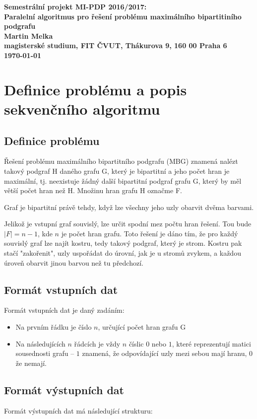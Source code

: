 \documentclass[czech]{article}
\begin{document}
\begin{center}
\bf Semestrální projekt MI-PDP 2016/2017:\\[5mm]
    Paralelní algoritmus pro řešení problému maximálního bipartitiního podgrafu\\[5mm] 
       Martin Melka\\[2mm]
magisterské studium, FIT ČVUT, Thákurova 9, 160 00 Praha 6\\[2mm]
\today
\end{center}

\section{Definice problému a popis sekvenčního algoritmu}

\subsection{Definice problému}
Řešení problému maximálního bipartitního podgrafu (MBG) znamená nalézt takový podgraf H daného grafu G, který je bipartitní a jeho počet hran je maximální, tj. neexistuje žádný další bipartitní podgraf grafu G, který by měl větší počet hran než H. Množinu hran grafu H označme F.

Graf je bipartitní právě tehdy, když lze všechny jeho uzly obarvit dvěma barvami.

Jelikož je vstupní graf souvislý, lze určit spodní mez počtu hran řešení. Tou bude $|F|=n-1$, kde $n$ je počet hran grafu. Toto řešení je dáno tím, že pro každý souvislý graf lze najít kostru, tedy takový podgraf, který je strom. Kostru pak stačí "zakořenit", uzly uspořádat do úrovní, jak je u stromů zvykem, a každou úroveň obarvit jinou barvou než tu předchozí.

\subsection{Formát vstupních dat}
Formát vstupních dat je daný zadáním:
\begin{itemize}
	\item Na prvním řádku je číslo $n$, určující počet hran grafu G
	\item Na následujících $n$ řádcích je vždy $n$ číslic $0$ nebo $1$, které reprezentují matici sousednosti grafu -- $1$ znamená, že odpovídající uzly mezi sebou mají hranu, $0$ že nemají.
\end{itemize}

\subsection{Formát výstupních dat}
Formát výstupních dat má následující strukturu:
\end{document}
